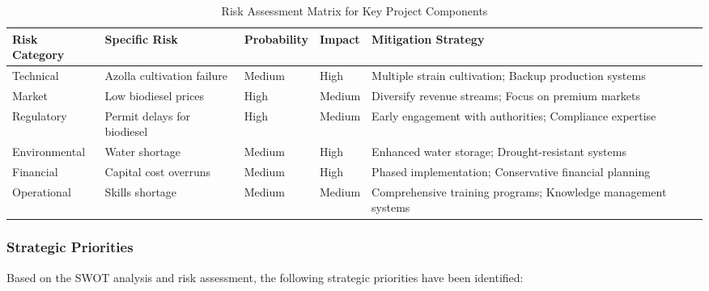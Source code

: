 \begin{table}[h]
\centering
\caption{Risk Assessment Matrix for Key Project Components}
\label{tab:risk_matrix}
\begin{tabular}{|p{3cm}|p{3cm}|p{2cm}|p{2cm}|p{3cm}|}
\hline
\textbf{Risk Category} & \textbf{Specific Risk} & \textbf{Probability} & \textbf{Impact} & \textbf{Mitigation Strategy} \\
\hline
Technical & Azolla cultivation failure & Medium & High & Multiple strain cultivation; Backup production systems \\
\hline
Market & Low biodiesel prices & High & Medium & Diversify revenue streams; Focus on premium markets \\
\hline
Regulatory & Permit delays for biodiesel & High & Medium & Early engagement with authorities; Compliance expertise \\
\hline
Environmental & Water shortage & Medium & High & Enhanced water storage; Drought-resistant systems \\
\hline
Financial & Capital cost overruns & Medium & High & Phased implementation; Conservative financial planning \\
\hline
Operational & Skills shortage & Medium & Medium & Comprehensive training programs; Knowledge management systems \\
\hline
\end{tabular}
\end{table}

\subsubsection{Strategic Priorities}

Based on the SWOT analysis and risk assessment, the following strategic priorities have been identified:

